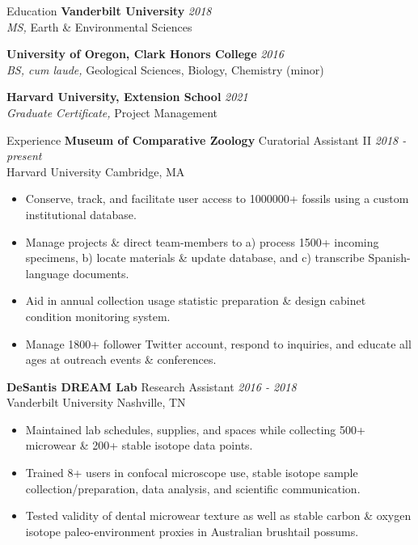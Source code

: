 \documentclass{resume} %
\begin{document}
			
	\begin{rSection}{Education}
		{\bf Vanderbilt University} \hfill {\em 2018} \\ 
		{\em MS,} Earth \& Environmental Sciences 
		
		{\bf University of Oregon, Clark Honors College}  \hfill {\em 2016} \\
		{\em BS, cum laude,} Geological Sciences, Biology, Chemistry (minor)
	
		{\bf Harvard University, Extension School} \hfill {\em 2021} \\
		{\em Graduate Certificate,} Project Management
	\end{rSection}
	
	\begin{rSection}{Experience}	
		{\bf Museum of Comparative Zoology }{Curatorial Assistant II} \hfill {\em 2018 - present} \\
		{Harvard University} \hfill {Cambridge, MA} 
		\begin{itemize}
			\itemsep -0.5em \vspace{-0.5em} \small
			\item Conserve, track, and facilitate user access to 1000000+ fossils using a custom institutional database.
			\item Manage projects \& direct team-members to a) process 1500+ incoming specimens, b) locate materials \& update database, and c) transcribe Spanish-language documents.
			\item Aid in annual collection usage statistic preparation \& design cabinet condition monitoring system.
			\item Manage 1800+ follower Twitter account, respond to inquiries, and educate all ages at outreach events \& conferences.
		\end{itemize}
	
		{\bf DeSantis DREAM Lab }{Research Assistant} \hfill {\em 2016 - 2018} \\
		{Vanderbilt University} \hfill {Nashville, TN} 
		\begin{itemize}
			\itemsep -0.5em \vspace{-0.5em} \small
			\item Maintained lab schedules, supplies, and spaces while collecting 500+ microwear \& 200+ stable isotope data points.
			\item Trained 8+ users in confocal microscope use, stable isotope sample collection/preparation, data analysis, and scientific communication.
			\item Tested validity of dental microwear texture as well as stable carbon \& oxygen isotope paleo-environment proxies in Australian brushtail possums.
		\end{itemize}
		

\end{rSection}
\end{document}
